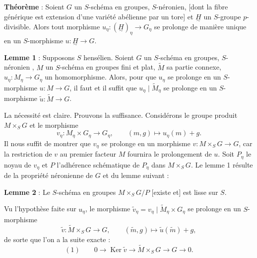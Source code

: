 \documentclass[11pt,a4paper]{article}
\begin{document}
\textbf{Théorème} : Soient $G$ un $S$-schéma en groupes, $S$-néronien, [dont
la fibre générique est extension d'une variété abélienne par un tore] et
$\underset{\sim}{H}$ un $S$-groupe $p$-divisible. Alors tout morphisme
$u_\eta : (\underset{\sim}{H})_\eta \to G_\eta$ se prolonge de manière unique
en un $S$-morphisme $u : \underset{\sim}{H} \to G$.

\textbf{Lemme 1} : Supposons $S$ hensélien. Soient $G$ un $S$-schéma en
groupes, $S$-néronien , $M$ un $S$-schéma en groupes fini et plat,
$\widetilde{M}$ sa partie connexe,  $u_\eta : M_\eta \to G_\eta$
un homomorphisme. Alors, pour que $u_\eta$ se prolonge en un $S$-morphisme
$u : M \to G$, il faut et il suffit que $u_\eta \mid \widetilde{M}_\eta$ se
prolonge en un $S$-morphisme $\widetilde{u} : \widetilde{M} \to G$.

La nécessité est claire. Prouvons la suffisance. Considérons le groupe produit
$M \times_S G$ et le morphisme
\[
  v_\eta : M_\eta \times G_\eta \longrightarrow G_\eta, \qquad
  (m, g) \longmapsto u_\eta(m) + g .
\]
Il nous suffit de montrer que $v_\eta$ se prolonge en un morphisme
$v : M \times_S G \to G$, car la restriction de $v$ au premier facteur $M$
fournira le prolongement de $u$. Soit $P_\eta$ le noyau de $v_\eta$ et $P$
l'adhérence schématique de $P_\eta$ dans $M \times_S G$. Le lemme 1 résulte de
la propriété néronienne de $G$ et du lemme suivant :

\textbf{Lemme 2} : Le $S$-schéma en groupes $M \times_S G/P$ [existe et] est
lisse sur $S$.

Vu l'hypothèse faite sur $u_\eta$, le morphisme
$\widetilde{v}_\eta = v_\eta \mid \widetilde{M}_\eta \times G_\eta$ se
prolonge en un $S$-morphisme
\[
  \widetilde{v} : \widetilde{M} \times_S G \longrightarrow G, \qquad
  (\widetilde{m}, g) \longmapsto \widetilde{u}(\widetilde{m}) + g ,
\]
de sorte que l'on a la suite exacte :
\[
  (1) \qquad 0 \to \operatorname{Ker} \widetilde{v} \to \widetilde{M} \times_S G
  \to G \to 0 .
\]
\end{document}
